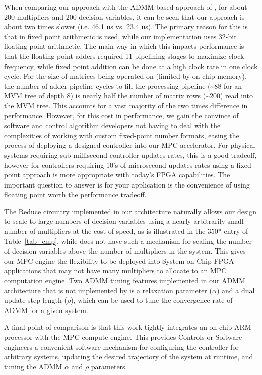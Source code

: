 When comparing our approach with the ADMM based approach of \cite{jerez2014embedded}, for about 200 multipliers and 200 decision variables, it can be seen that our approach is about two times slower (i.e. 46.1 us vs. 23.4 us). The primary reason for this is that in \cite{jerez2014embedded} fixed point arithmetic is used, while our implementation uses 32-bit floating point arithmetic. The main way in which this impacts performance is that the floating point adders required 11 pipelining stages to maximize clock frequency, while fixed point addition can be done at a high clock rate in one clock cycle. For the size of matrices being operated on (limited by on-chip memory), the number of adder pipeline cycles to fill the processing pipeline (\textasciitilde{88} for an MVM tree of depth 8) is nearly half the number of matrix rows (\textasciitilde{200}) read into the MVM tree. This accounts for a vast majority of the two times difference in performance. However, for this cost in performance, we gain the convince of software and control algorithm developers not having to deal with the complexities of working with custom fixed-point number formats, easing the process of deploying a designed controller into our MPC accelerator. For physical systems requiring sub-millisecond controller updates rates, this is a good tradeoff, however for controllers requiring 10’s of microsecond updates rates using a fixed-point approach is more appropriate with today’s FPGA capabilities. The important question to answer is for your application is the convenience of using floating point worth the performance tradeoff.
 
The Reduce circuitry implemented in our architecture naturally allows our design to scale to large numbers of decision variables using a nearly arbitrarily small number of multipliers at the cost of speed, as is illustrated in the 350* entry of Table~\ref{tab_cmp}, while \cite{jerez2014embedded} does not have such a mechanism for scaling the number of decision variables above the number of multipliers in the system. This gives our MPC engine the flexibility to be deployed into System-on-Chip FPGA applications that may not have many multipliers to allocate to an MPC computation engine. Two ADMM tuning features implemented in our ADMM architecture that is not implemented by \cite{jerez2014embedded} is a relaxation parameter ($\alpha$) and a dual update step length ($\rho$), which can be used to tune the convergence rate of ADMM for a given system.

A final point of comparison is that this work tightly integrates an on-chip ARM processor with the MPC compute engine. This provides Controls or Software engineers a convenient software mechanism for configuring the controller for arbitrary systems, updating the desired trajectory of the system at runtime, and tuning the ADMM $\alpha$ and $\rho$ parameters.



